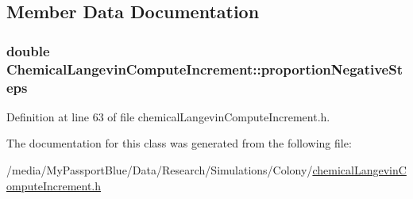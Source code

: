 \subsection{\-Member \-Data \-Documentation}
\hypertarget{class_chemical_langevin_compute_increment_aebc8634943805505fba3d5a5dac51945}{
\subsubsection[{proportion\-Negative\-Steps}]{\setlength{\rightskip}{0pt plus 5cm}double {\bf \-Chemical\-Langevin\-Compute\-Increment\-::proportion\-Negative\-Steps}}}\label{class_chemical_langevin_compute_increment_aebc8634943805505fba3d5a5dac51945}


\-Definition at line 63 of file chemical\-Langevin\-Compute\-Increment.\-h.



\-The documentation for this class was generated from the following file\-:\begin{DoxyCompactItemize}
\item 
/media/\-My\-Passport\-Blue/\-Data/\-Research/\-Simulations/\-Colony/\hyperlink{chemical_langevin_compute_increment_8h}{chemical\-Langevin\-Compute\-Increment.\-h}\end{DoxyCompactItemize}
